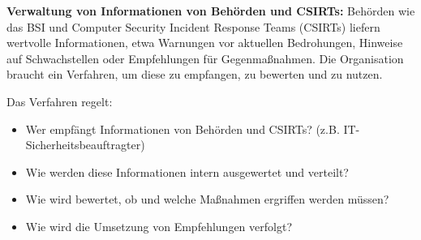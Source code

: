 \textbf{Verwaltung von Informationen von Behörden und CSIRTs:} Behörden wie das BSI und Computer Security Incident Response Teams (CSIRTs) liefern wertvolle Informationen, etwa Warnungen vor aktuellen Bedrohungen, Hinweise auf Schwachstellen oder Empfehlungen für Gegenmaßnahmen. Die Organisation braucht ein Verfahren, um diese zu empfangen, zu bewerten und zu nutzen.

Das Verfahren regelt:
\begin{itemize}
    \item Wer empfängt Informationen von Behörden und CSIRTs? (z.B. IT-Sicherheitsbeauftragter)
    \item Wie werden diese Informationen intern ausgewertet und verteilt?
    \item Wie wird bewertet, ob und welche Maßnahmen ergriffen werden müssen?
    \item Wie wird die Umsetzung von Empfehlungen verfolgt?
\end{itemize}

